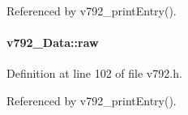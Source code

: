 Referenced by v792\_\-printEntry().
\paragraph[{raw}]{ {\bf v792\_\-Data::raw}}\hfill\label{unionv792__Data_af162c70c862a41d4e54c698bdddf160c}


Definition at line 102 of file v792.h.

Referenced by v792\_\-printEntry().